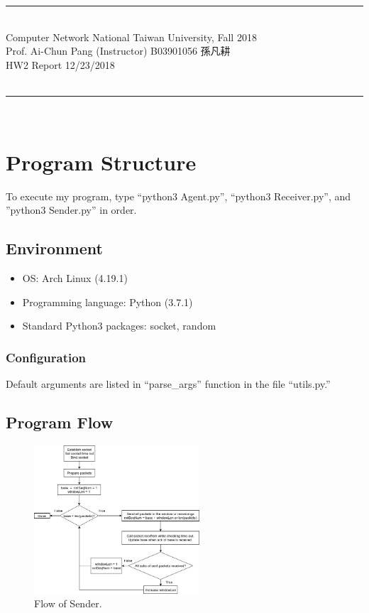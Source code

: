 \documentclass{article}
\begin{document}
{\bf \noindent
\rule[3pt]{\textwidth}{0.3pt}\\
Computer Network \hfill National Taiwan University, Fall 2018 \\
Prof. Ai-Chun Pang (Instructor) \hfill B03901056 孫凡耕 \\
HW2 Report \hfill 12/23/2018 \\
\vspace{-14pt} \\
\rule[3pt]{\textwidth}{1.3pt}\\
[-1cm]
}


\section{Program Structure}

To execute my program, type ``python3 Agent.py'', ``python3 Receiver.py'', and ''python3 Sender.py'' in order.

\subsection{Environment}
\begin{itemize}
  \item OS: Arch Linux (4.19.1)
  \item Programming language: Python (3.7.1)
  \item Standard Python3 packages: socket, random
\end{itemize}

\subsubsection{Configuration}
Default arguments are listed in ``parse\_args'' function in the file ``utils.py.''

\subsection{Program Flow}
\begin{figure}[h]
 \centering
 \includegraphics[width=0.55\textwidth]{Sender.png}
 \caption{Flow of Sender.}
\end{figure}
\end{document}
